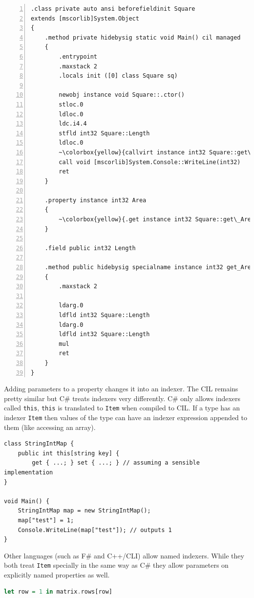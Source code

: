 \documentclass[english]{report}
\begin{document}
\begin{lstlisting}[numbers=left,language=cil,escapechar={~}]
.class private auto ansi beforefieldinit Square     
extends [mscorlib]System.Object 
{ 
	.method private hidebysig static void Main() cil managed     
	{         
		.entrypoint
		.maxstack 2
		.locals init ([0] class Square sq)
   
		newobj instance void Square::.ctor()         
		stloc.0          
		ldloc.0          
		ldc.i4.4          
		stfld int32 Square::Length         
		ldloc.0          
		~\colorbox{yellow}{callvirt instance int32 Square::get\_Area()}~
		call void [mscorlib]System.Console::WriteLine(int32)         
		ret
	}
	
	.property instance int32 Area     
	{
		~\colorbox{yellow}{.get instance int32 Square::get\_Area()}~
	}
	
	.field public int32 Length 

	.method public hidebysig specialname instance int32 get_Area() cil managed
	{
		.maxstack 2

		ldarg.0
		ldfld int32 Square::Length
		ldarg.0 
		ldfld int32 Square::Length
		mul
		ret  
	}
}
\end{lstlisting}

Adding parameters to a property changes it into an indexer. The CIL remains
pretty similar but C\# treats indexers very differently. C\# only allows
indexers called \texttt{this}, \texttt{this} is translated to \texttt{Item}
when compiled to CIL. If a type has an indexer \texttt{Item} then values of the
type can have an indexer expression appended to them (like accessing an array).

\begin{lstlisting}[keywordstyle={\color{blue}},language=sharpc]
class StringIntMap {
	public int this[string key] { 
		get { ...; } set { ...; } // assuming a sensible implementation
}

void Main() {
	StringIntMap map = new StringIntMap();
	map["test"] = 1;
	Console.WriteLine(map["test"]); // outputs 1
}
\end{lstlisting}

Other languages (such as F\# and C++/CLI) allow named indexers. While they
both treat \texttt{Item} specially in the same way as C\# they allow parameters
on explicitly named properties as well.

\begin{lstlisting}[keywordstyle={\color{blue}},language=haskell]
let row = 1 in matrix.rows[row]
\end{lstlisting}
\end{document}
